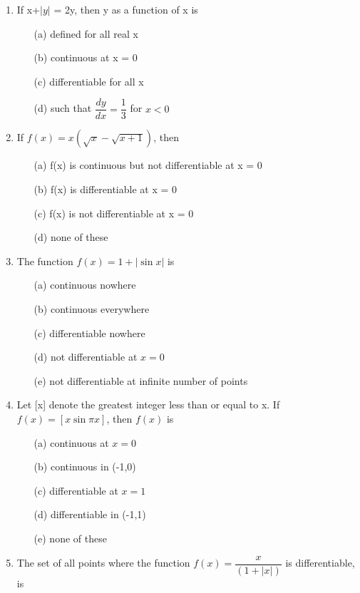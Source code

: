 \begin{enumerate}[label=\arabic*.,ref=\thesubsection.\theenumi]
\item If x+$|y|$ = 2y, then y as a function of x is
\begin{itemize}
\item[(a)] defined for all real x
\item[(b)] continuous at x = 0
\item[(c)] differentiable for all x
\item[(d)] such that $\dfrac{dy}{dx}=\dfrac{1}{3}$ for $x<0$\\
\end{itemize}

\item If $f(x)=x(\sqrt{x}-\sqrt{x+1})$, then
\begin{itemize}
\item[(a)] f(x) is continuous but not differentiable at x = 0
\item[(b)] f(x) is differentiable at x = 0
\item[(c)] f(x) is not differentiable at x = 0
\item[(d)] none of these
\end{itemize}

\item The function $f(x)=1+|\sin x|$ is
\begin{itemize}
\item[(a)] continuous nowhere
\item[(b)] continuous everywhere
\item[(c)] differentiable nowhere
\item[(d)] not differentiable at $x=0$
\item[(e)] not differentiable at infinite number of points
\end{itemize}

\item Let [x] denote the greatest integer less than or equal to x. If $f(x)=[x \sin\pi x]$, then $f(x)$ is
\begin{itemize}
\item[(a)] continuous at $x=0$ \item[(b)] continuous in (-1,0) \item[(c)] differentiable at $x=1$ \item[(d)] differentiable in (-1,1) \item[(e)] none of these
\end{itemize}

\item The set of all points where the function $f(x)=\dfrac{x}{(1+|x|)}$ is differentiable, is
\begin{itemize}
\begin{multicols}{2}
\item[(a)] $(-\infty,\infty)$ \item[(c)] $(-\infty,0)\cup(0,\infty)$ \item[(e)] None \item[(b)] $[0,\infty)$ \item[(d)] $(0,\infty)$
\end{multicols}
\end{itemize}


\end{enumerate}
